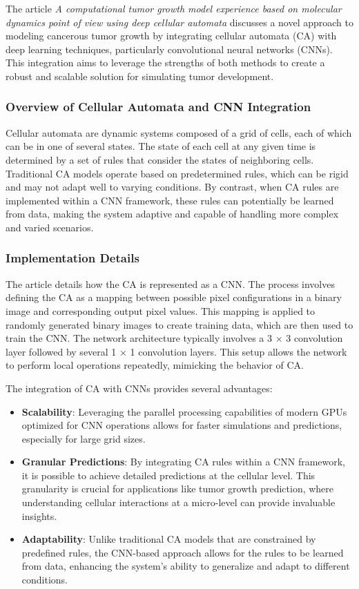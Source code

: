 \documentclass[9pt,a4paper,twoside]{tau-class/tau}
\begin{document}
The article \textit{A computational tumor growth model experience based on molecular dynamics point of view using deep cellular automata} discusses a novel approach to modeling cancerous tumor growth by integrating cellular automata (CA) with deep learning techniques, particularly convolutional neural networks (CNNs). This integration aims to leverage the strengths of both methods to create a robust and scalable solution for simulating tumor development.\cite{MATIN2024102752}

\subsubsection{Overview of Cellular Automata and CNN Integration}

Cellular automata are dynamic systems composed of a grid of cells, each of which can be in one of several states. The state of each cell at any given time is determined by a set of rules that consider the states of neighboring cells. Traditional CA models operate based on predetermined rules, which can be rigid and may not adapt well to varying conditions. By contrast, when CA rules are implemented within a CNN framework, these rules can potentially be learned from data, making the system adaptive and capable of handling more complex and varied scenarios.

\subsubsection{Implementation Details}

The article details how the CA is represented as a CNN. The process involves defining the CA as a mapping between possible pixel configurations in a binary image and corresponding output pixel values. This mapping is applied to randomly generated binary images to create training data, which are then used to train the CNN. The network architecture typically involves a 3 $×$ 3 convolution layer followed by several 1 $×$ 1 convolution layers. This setup allows the network to perform local operations repeatedly, mimicking the behavior of CA.

The integration of CA with CNNs provides several advantages:

\begin{itemize}
    \item \textbf{Scalability}: Leveraging the parallel processing capabilities of modern GPUs optimized for CNN operations allows for faster simulations and predictions, especially for large grid sizes.
    \item \textbf{Granular Predictions}: By integrating CA rules within a CNN framework, it is possible to achieve detailed predictions at the cellular level. This granularity is crucial for applications like tumor growth prediction, where understanding cellular interactions at a micro-level can provide invaluable insights.
    \item \textbf{Adaptability}: Unlike traditional CA models that are constrained by predefined rules, the CNN-based approach allows for the rules to be learned from data, enhancing the system's ability to generalize and adapt to different conditions.
\end{itemize}
\end{document}
